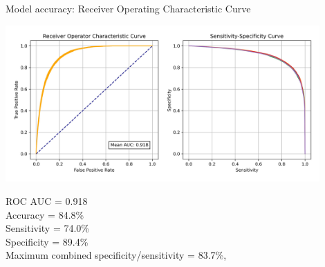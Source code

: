 \begin{frame}{Model accuracy: Receiver Operating Characteristic Curve}


\begin{center}
\includegraphics[width=0.9\textwidth]{./images/02_xgb_10_features_roc_sens_spec}
\end{center}
\footnotesize
ROC AUC = 0.918\\
Accuracy = 84.8\%\\
Sensitivity = 74.0\%\\
Specificity = 89.4\%\\
Maximum combined specificity/sensitivity = 83.7\%,

\end{frame}